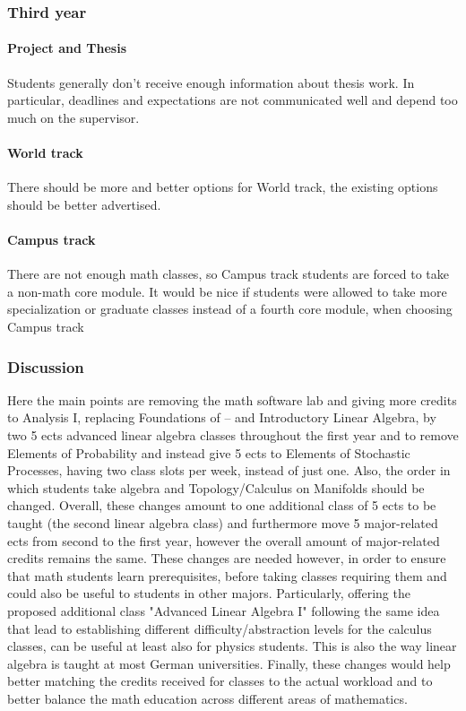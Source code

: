 \subsubsection{Third year}
\label{sec-1-3-3}
\paragraph{Project and Thesis} Students generally don't receive enough information about thesis work. 
In particular, deadlines and expectations are not communicated well and depend too much on the supervisor. 
\paragraph{World track} There should be more and better options for World track, the existing options should be better advertised.
\paragraph{Campus track} There are not enough math classes, so Campus track students are forced to take a non-math core module. 
It would be nice if students were allowed to take more specialization or graduate classes instead of a fourth core module, when choosing Campus track


\subsubsection{Discussion}
\label{sec-1-3-4}
Here the main points are removing the math software lab and giving more credits to Analysis I, replacing Foundations of -- and Introductory Linear Algebra, by two 5 ects advanced linear algebra classes throughout the first year and to remove Elements of Probability and instead give 5 ects to Elements of Stochastic Processes, having two class slots per week, instead of just one.  
Also, the order in which students take algebra and Topology/Calculus on Manifolds should be changed.
Overall, these changes amount to one additional class of 5 ects to be taught (the second linear algebra class) and
furthermore move 5 major-related ects from second to the first year, however the overall amount of major-related credits remains the same. 
These changes are needed however, in order to ensure that math students learn prerequisites, before taking classes requiring them and could also be useful to students in other majors. 
Particularly, offering the proposed additional class "Advanced Linear Algebra I" following the same idea that lead to establishing different difficulty/abstraction levels for the calculus classes, can be useful at least also for physics students.
This is also the way linear algebra is taught at most German universities.
Finally, these changes would help better matching the credits received for classes to the actual workload and to better balance the math education across different areas of mathematics. 



